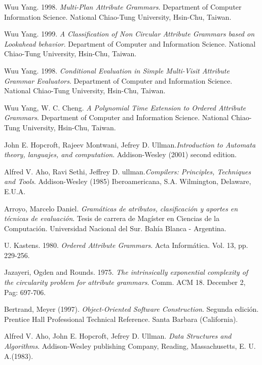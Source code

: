 
\begin{thebibliography}{10}

 Wuu Yang. 1998. \textit{Multi-Plan Attribute Grammars}. Department of Computer Information Science. National Chiao-Tung University, Hsin-Chu, Taiwan.

 Wuu Yang. 1999. \textit{A Classification of Non Circular Attribute Grammars based on Lookahead behavior}. Department of Computer and Information Science. National Chiao-Tung University, Hsin-Chu, Taiwan.

 Wuu Yang. 1998. \textit{Conditional Evaluation in Simple Multi-Visit Attribute Grammar Evaluators}. Department of Computer and Information Science. National Chiao-Tung University, Hsin-Chu, Taiwan.

 Wuu Yang, W. C. Cheng. \emph{A Polynomial Time Extension to Ordered Attribute Grammars}. Department of Computer and Information Science. National Chiao-Tung University, Hsin-Chu, Taiwan.

 John E. Hopcroft, Rajeev Montwani, Jefrey D. Ullman.\textit{Introduction to Automata theory, languajes, and computation}. Addison-Wesley (2001) second edition.

 Alfred V. Aho, Ravi Sethi, Jeffrey D. ullman.\textit{Compilers: Principles, Techniques and Tools}. Addison-Wesley (1985)  Iberoamericana, S.A. Wilmington, Delaware, E.U.A.

 Arroyo, Marcelo Daniel. \textit{Gramáticas de atributos, clasificación y aportes en técnicas de evaluación}. Tesis de carrera de Magíster en Ciencias de la Computación. Universidad Nacional del Sur. Bahía Blanca - Argentina.

 U. Kastens. 1980. \textit{Ordered Attribute Grammars}. Acta Informática. Vol. 13, pp. 229-256.

 Jazayeri, Ogden and Rounds. 1975. \emph{The intrinsically exponential complexity of the circularity problem for attribute grammars}. Comm. ACM 18. December 2, Pag: 697-706.

 Bertrand, Meyer (1997). \textit{Object-Oriented Software Construction}. Segunda edición. Prentice Hall Professional Technical Reference. Santa Barbara (California).

 Alfred V. Aho, John E. Hopcroft, Jefrey D. Ullman. \textit{Data Structures and Algorithms}. Addison-Wesley publishing Company, Reading, Massachusetts, E. U. A.(1983).


\end{thebibliography}
